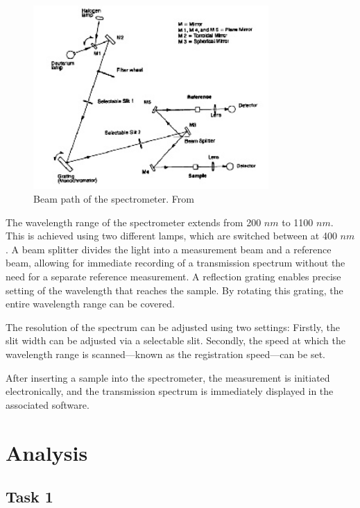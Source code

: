 \documentclass{article}
\begin{document}
\begin{figure}[h]
    \centering
    \includegraphics[width=0.8\textwidth]{Figures/Introduction/Path.jpg} %
    \caption{Beam path of the spectrometer. From \cite{riede_optical}}
    \label{fig:beam_path}
\end{figure}

The wavelength range of the spectrometer extends from 200 $nm$ to 1100 $nm$. This is achieved using two different lamps, which are switched between at 400 $nm$. A beam splitter divides the light into a measurement beam and a reference beam, allowing for immediate recording of a transmission spectrum without the need for a separate reference measurement. A reflection grating enables precise setting of the wavelength that reaches the sample. By rotating this grating, the entire wavelength range can be covered.

The resolution of the spectrum can be adjusted using two settings: Firstly, the slit width can be adjusted via a selectable slit. Secondly, the speed at which the wavelength range is scanned—known as the registration speed—can be set.

After inserting a sample into the spectrometer, the measurement is initiated electronically, and the transmission spectrum is immediately displayed in the associated software.

\pagebreak{}

\section{Analysis}

\subsection{Task 1}
\end{document}
